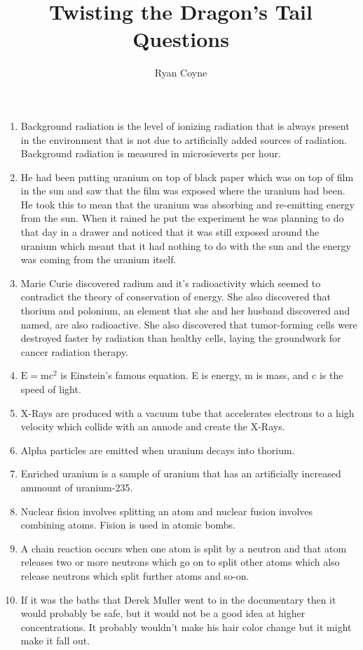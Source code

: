 \documentclass[12pt]{article}
\begin{document}
    \title{Twisting the Dragon's Tail Questions}
    \author{Ryan Coyne}
    \maketitle
    \begin{enumerate}
        \item Background radiation is the level of ionizing radiation that is always present in the environment that is not due to artificially added sources of radiation. Background radiation is measured in microsieverts per hour.
        \item  He had been putting uranium on top of black paper which was on top of film in the sun and saw that the film was exposed where the uranium had been. He took this to mean that the uranium was absorbing and re-emitting energy from the sun. When it rained he put the experiment he was planning to do that day in a drawer and noticed that it was still exposed around the uranium which meant that it had nothing to do with the sun and the energy was coming from the uranium itself.
        \item Marie Curie discovered radium and it's radioactivity which seemed to contradict the theory of conservation of energy. She also discovered that thorium and polonium, an element that she and her husband discovered and named, are also radioactive. She also discovered that tumor-forming cells were destroyed faster by radiation than healthy cells, laying the groundwork for cancer radiation therapy.
        \item \(\mathrm{E=mc^2}\) is Einstein's famous equation. E is energy, m is mass, and c is the speed of light.
        \item X-Rays are produced with a vacuum tube that accelerates electrons to a high velocity which collide with an annode and create the X-Rays.
        \item Alpha particles are emitted when uranium decays into thorium.
        \item Enriched uranium is a sample of uranium that has an artificially increased ammount of uranium-235.
        \item Nuclear fision involves splitting an atom and nuclear fusion involves combining atoms. Fision is used in atomic bombs.
        \item A chain reaction occurs when one atom is split by a neutron and that atom releases two or more neutrons which go on to split other atoms which also release neutrons which split further atoms and so-on.
        \item If it was the baths that Derek Muller went to in the documentary then it would probably be safe, but it would not be a good idea at higher concentrations. It probably wouldn't make his hair color change but it might make it fall out.
    \end{enumerate}
\end{document}
